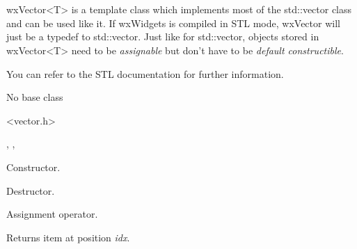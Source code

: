 \section{}\label{wxvector}

wxVector<T> is a template class which implements most of the std::vector
class and can be used like it. If wxWidgets is compiled in STL mode,
wxVector will just be a typedef to std::vector. Just like for std::vector,
objects stored in wxVector<T> need to be {\it assignable} but don't have to
be {\it default constructible}.

You can refer to the STL documentation for further information.


No base class


<vector.h>


, 
,

\label{wxvectorwxvector}



Constructor.

\label{wxvectordtor}


Destructor.

\label{wxvectoroperatorassign}


Assignment operator.

\label{wxvectorat}



Returns item at position {\it idx}.

\label{wxvectorback}



